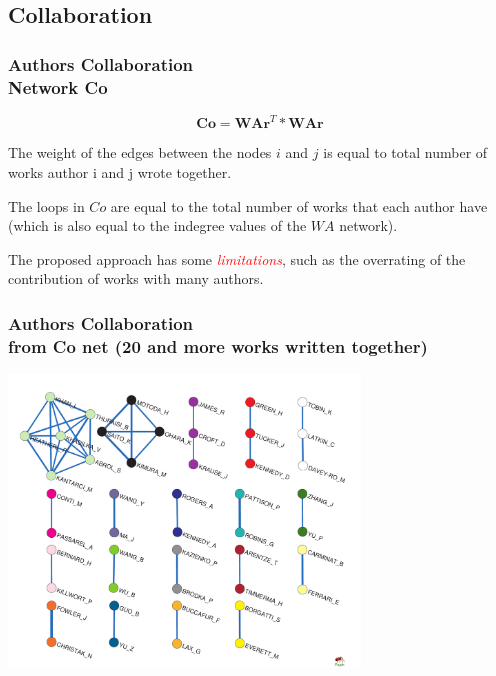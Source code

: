 \documentclass[hyperref={pdfstartview={FitBH -32768},
                         pdfpagemode=FullScreen,
                         plainpages=false,
                         colorlinks=true}
              ]{beamer}
\newcommand{\keyw}[1]{\textcolor{red}{\emph{#1}}}
\begin{document}
\subsection{Collaboration}  

\begin{frame}[fragile]
\frametitle{Authors Collaboration\\ \normalsize Network Co}
\footnotesize

\[ \mathbf{Co} = \mathbf{WAr}^T * \mathbf{WAr} \] 

The weight of the edges between the nodes $i$ and $j$ is equal to total number of works author i and j wrote together. \smallskip 

The loops in $Co$ are equal to the total number of works that each author have (which is also equal to the indegree values of the $WA$ network). \medskip 

The proposed approach has some \keyw{limitations}, such as the overrating of the contribution of works with many authors.

\end{frame}

\begin{frame}[fragile]
\frametitle{Authors Collaboration \\ \normalsize from Co net (20 and more works written together)}

\begin{center}
\includegraphics[width=0.7\textwidth]{CoN_Pairs.pdf}
\end{center}

\end{frame}
\end{document}
